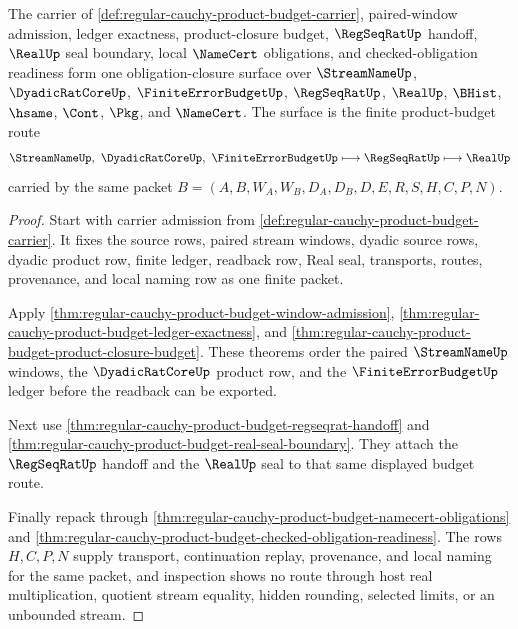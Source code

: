 \begin{theorem}
\label{thm:regular-cauchy-product-budget-obligation-scope}
The carrier of \autoref{def:regular-cauchy-product-budget-carrier}, paired-window admission, ledger exactness, product-closure budget, $\RegSeqRatUp$ handoff, $\RealUp$ seal boundary, local $\NameCert$ obligations, and checked-obligation readiness form one obligation-closure surface over $\StreamNameUp$, $\DyadicRatCoreUp$, $\FiniteErrorBudgetUp$, $\RegSeqRatUp$, $\RealUp$, $\BHist$, $\hsame$, $\Cont$, $\Pkg$, and $\NameCert$. The surface is the finite product-budget route
$$
\StreamNameUp,\ \DyadicRatCoreUp,\ \FiniteErrorBudgetUp \longmapsto \RegSeqRatUp \longmapsto \RealUp
$$
carried by the same packet $B=(A,B,W_A,W_B,D_A,D_B,D,E,R,S,H,C,P,N)$.
\end{theorem}
\begin{proof}
Start with carrier admission from \autoref{def:regular-cauchy-product-budget-carrier}. It fixes the source rows, paired stream windows, dyadic source rows, dyadic product row, finite ledger, readback row, Real seal, transports, routes, provenance, and local naming row as one finite packet.

Apply \autoref{thm:regular-cauchy-product-budget-window-admission}, \autoref{thm:regular-cauchy-product-budget-ledger-exactness}, and \autoref{thm:regular-cauchy-product-budget-product-closure-budget}. These theorems order the paired $\StreamNameUp$ windows, the $\DyadicRatCoreUp$ product row, and the $\FiniteErrorBudgetUp$ ledger before the readback can be exported.

Next use \autoref{thm:regular-cauchy-product-budget-regseqrat-handoff} and \autoref{thm:regular-cauchy-product-budget-real-seal-boundary}. They attach the $\RegSeqRatUp$ handoff and the $\RealUp$ seal to that same displayed budget route.

Finally repack through \autoref{thm:regular-cauchy-product-budget-namecert-obligations} and \autoref{thm:regular-cauchy-product-budget-checked-obligation-readiness}. The rows $H,C,P,N$ supply transport, continuation replay, provenance, and local naming for the same packet, and inspection shows no route through host real multiplication, quotient stream equality, hidden rounding, selected limits, or an unbounded stream.
\end{proof}

